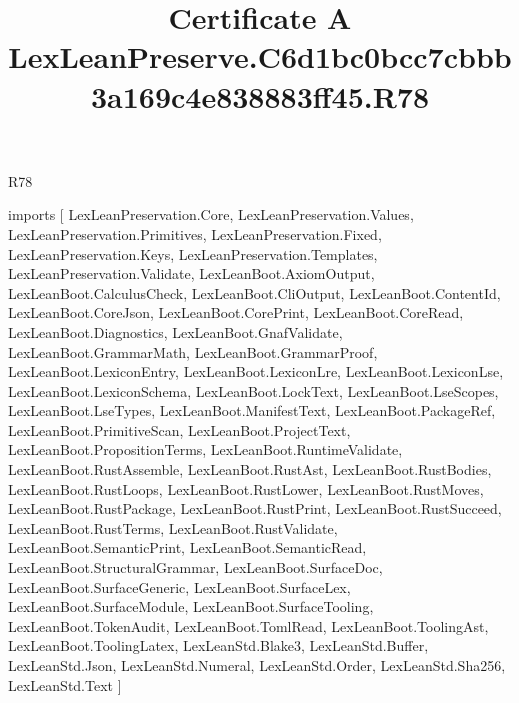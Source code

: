 \begin{lexlean}{R78}
\title{Certificate A LexLeanPreserve.C6d1bc0bcc7cbbb3a169c4e838883ff45.R78}
\begin{coremodule}
imports [
  LexLeanPreservation.Core,
  LexLeanPreservation.Values,
  LexLeanPreservation.Primitives,
  LexLeanPreservation.Fixed,
  LexLeanPreservation.Keys,
  LexLeanPreservation.Templates,
  LexLeanPreservation.Validate,
  LexLeanBoot.AxiomOutput,
  LexLeanBoot.CalculusCheck,
  LexLeanBoot.CliOutput,
  LexLeanBoot.ContentId,
  LexLeanBoot.CoreJson,
  LexLeanBoot.CorePrint,
  LexLeanBoot.CoreRead,
  LexLeanBoot.Diagnostics,
  LexLeanBoot.GnafValidate,
  LexLeanBoot.GrammarMath,
  LexLeanBoot.GrammarProof,
  LexLeanBoot.LexiconEntry,
  LexLeanBoot.LexiconLre,
  LexLeanBoot.LexiconLse,
  LexLeanBoot.LexiconSchema,
  LexLeanBoot.LockText,
  LexLeanBoot.LseScopes,
  LexLeanBoot.LseTypes,
  LexLeanBoot.ManifestText,
  LexLeanBoot.PackageRef,
  LexLeanBoot.PrimitiveScan,
  LexLeanBoot.ProjectText,
  LexLeanBoot.PropositionTerms,
  LexLeanBoot.RuntimeValidate,
  LexLeanBoot.RustAssemble,
  LexLeanBoot.RustAst,
  LexLeanBoot.RustBodies,
  LexLeanBoot.RustLoops,
  LexLeanBoot.RustLower,
  LexLeanBoot.RustMoves,
  LexLeanBoot.RustPackage,
  LexLeanBoot.RustPrint,
  LexLeanBoot.RustSucceed,
  LexLeanBoot.RustTerms,
  LexLeanBoot.RustValidate,
  LexLeanBoot.SemanticPrint,
  LexLeanBoot.SemanticRead,
  LexLeanBoot.StructuralGrammar,
  LexLeanBoot.SurfaceDoc,
  LexLeanBoot.SurfaceGeneric,
  LexLeanBoot.SurfaceLex,
  LexLeanBoot.SurfaceModule,
  LexLeanBoot.SurfaceTooling,
  LexLeanBoot.TokenAudit,
  LexLeanBoot.TomlRead,
  LexLeanBoot.ToolingAst,
  LexLeanBoot.ToolingLatex,
  LexLeanStd.Blake3,
  LexLeanStd.Buffer,
  LexLeanStd.Json,
  LexLeanStd.Numeral,
  LexLeanStd.Order,
  LexLeanStd.Sha256,
  LexLeanStd.Text
]


\end{coremodule}
\end{lexlean}
